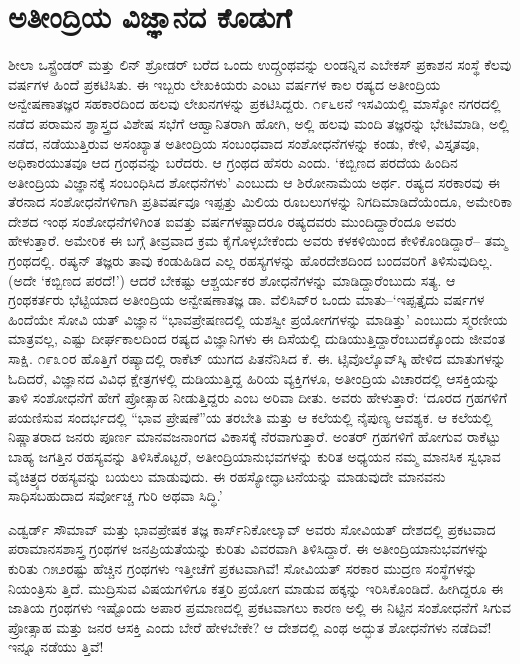 \section*{ಅತೀಂದ್ರಿಯ ವಿಜ್ಞಾನದ ಕೊಡುಗೆ}


ಶೀಲಾ ಒಸ್ಟ್ರೆಂಡರ್ ಮತ್ತು ಲಿನ್ ಶ್ರೋಡರ್ ಬರೆದ ಒಂದು ಉದ್ಗ್ರಂಥವನ್ನು ಲಂಡನ್ನಿನ ಎಬೇಕಸ್ ಪ್ರಕಾಶನ ಸಂಸ್ಥೆ ಕೆಲವು ವರ್ಷಗಳ ಹಿಂದೆ ಪ್ರಕಟಿಸಿತು. ಈ ಇಬ್ಬರು ಲೇಖಕಿಯರು ಎಂಟು ವರ್ಷಗಳ ಕಾಲ ರಷ್ಯದ ಅತೀಂದ್ರಿಯ ಅನ್ವೇಷಣಾತಜ್ಞರ ಸಹಕಾರದಿಂದ ಹಲವು ಲೇಖನಗಳನ್ನು ಪ್ರಕಟಿಸಿದ್ದರು. ೧೯೬೮ನೆ ಇಸವಿಯಲ್ಲಿ ಮಾಸ್ಕೋ ನಗರದಲ್ಲಿ ನಡೆದ ಪರಾಮನ ಶ್ಶಾಸ್ತ್ರದ ವಿಶೇಷ ಸಭೆಗೆ ಆಹ್ವಾನಿತರಾಗಿ ಹೋಗಿ, ಅಲ್ಲಿ ಹಲವು ಮಂದಿ ತಜ್ಞರನ್ನು ಭೇಟಿಮಾಡಿ, ಅಲ್ಲಿ ನಡೆದ, ನಡೆಯುತ್ತಿರುವ ಅಸಂಖ್ಯಾತ ಅತೀಂದ್ರಿಯ ಸಂಬಂಧವಾದ ಸಂಶೋಧನೆಗಳನ್ನು ಕಂಡು, ಕೇಳಿ, ವಿಸ್ತೃತವೂ, ಅಧಿಕಾರಯುತವೂ ಆದ ಗ್ರಂಥವನ್ನು ಬರೆದರು. ಆ ಗ್ರಂಥದ ಹೆಸರು  ಎಂದು. ‘ಕಬ್ಬಿಣದ ಪರದೆಯ ಹಿಂದಿನ ಅತೀಂದ್ರಿಯ ವಿಜ್ಞಾನಕ್ಕೆ ಸಂಬಂಧಿಸಿದ ಶೋಧನೆಗಳು’ ಎಂಬುದು ಆ ಶಿರೋನಾಮೆಯ ಅರ್ಥ. ರಷ್ಯದ ಸರಕಾರವು ಈ ತೆರನಾದ ಸಂಶೋಧನೆಗಳಿಗಾಗಿ ಪ್ರತಿವರ್ಷವೂ ಇಪ್ಪತ್ತು ಮಿಲಿಯ ರೂಬಲುಗಳನ್ನು ನಿಗದಿಮಾಡಿದೆಯೆಂದೂ, ಅಮೇರಿಕಾ ದೇಶದ ಇಂಥ ಸಂಶೋಧನೆಗಳಿಗಿಂತ ಐವತ್ತು ವರ್ಷಗಳಷ್ಟಾದರೂ ರಷ್ಯದವರು ಮುಂದಿದ್ದಾರೆಂದೂ ಅವರು ಹೇಳುತ್ತಾರೆ. ಅಮೇರಿಕ ಈ ಬಗ್ಗೆ ತೀವ್ರವಾದ ಕ್ರಮ ಕೈಗೊಳ್ಳಬೇಕೆಂದು ಅವರು ಕಳಕಳಿಯಿಂದ ಕೇಳಿಕೊಂಡಿದ್ದಾರೆ– ತಮ್ಮ ಗ್ರಂಥದಲ್ಲಿ. ರಷ್ಯನ್ ತಜ್ಞರು ತಾವು ಕಂಡುಹಿಡಿದ ಎಲ್ಲ ರಹಸ್ಯಗಳನ್ನು ಹೊರದೇಶದಿಂದ ಬಂದವರಿಗೆ ತಿಳಿಸುವುದಿಲ್ಲ. (ಅದೇ ‘ಕಬ್ಬಿಣದ ಪರದೆ!’) ಆದರೆ ಬೇಕಷ್ಟು ಆಶ್ಚರ್ಯಕರ ಶೋಧನೆಗಳನ್ನು ಮಾಡಿದ್ದಾರೆಂಬುದು ಸತ್ಯ. ಆ ಗ್ರಂಥಕರ್ತರು ಭೆಟ್ಟಿಯಾದ ಅತೀಂದ್ರಿಯ ಅನ್ವೇಷಣಾತಜ್ಞ ಡಾ. ವೆಲಿಸಿವ್​ರ ಒಂದು ಮಾತು–‘ಇಪ್ಪತ್ತೈದು ವರ್ಷಗಳ ಹಿಂದೆಯೇ ಸೋವಿ ಯತ್ ವಿಜ್ಞಾನ “ಭಾವಪ್ರೇಷಣದಲ್ಲಿ ಯಶಸ್ವೀ ಪ್ರಯೋಗಗಳನ್ನು ಮಾಡಿತ್ತು’ ಎಂಬುದು ಸ್ಮರಣೀಯ ಮಾತ್ರವಲ್ಲ, ಎಷ್ಟು ದೀರ್ಘಕಾಲದಿಂದ ರಷ್ಯದ ವಿಜ್ಞಾನಿಗಳು ಈ ದಿಸೆಯಲ್ಲಿ ದುಡಿಯುತ್ತಿದ್ದಾರೆಂಬುದಕ್ಕೊಂದು ಜೀವಂತ ಸಾಕ್ಷಿ. ೧೯೩೦ರ ಹೊತ್ತಿಗೆ ರಷ್ಯಾದಲ್ಲಿ ರಾಕೆಟ್ ಯುಗದ ಪಿತನೆನಿಸಿದ ಕೆ. ಈ. ಟ್ಸಿವೊಲ್ಕೊವ್​ಸ್ಕಿ ಹೇಳಿದ ಮಾತುಗಳನ್ನು ಓದಿದರೆ, ವಿಜ್ಞಾನದ ವಿವಿಧ ಕ್ಷೇತ್ರಗಳಲ್ಲಿ ದುಡಿಯುತ್ತಿದ್ದ ಹಿರಿಯ ವ್ಯಕ್ತಿಗಳೂ, ಅತೀಂದ್ರಿಯ ವಿಚಾರದಲ್ಲಿ ಆಸಕ್ತಿಯನ್ನು ತಾಳಿ ಸಂಶೋಧನೆಗೆ ಹೇಗೆ ಪ್ರೋತ್ಸಾಹ ನೀಡುತ್ತಿದ್ದರು ಎಂಬ ಅರಿವಾ ದೀತು. ಅವರು ಹೇಳುತ್ತಾರೆ: ‘ದೂರದ ಗ್ರಹಗಳಿಗೆ ಪಯಣಿಸುವ ಸಂದರ್ಭದಲ್ಲಿ “ಭಾವ ಪ್ರೇಷಣೆ”ಯ ತರಬೇತಿ ಮತ್ತು ಆ ಕಲೆಯಲ್ಲಿ ನೈಪುಣ್ಯ ಆವಶ್ಯಕ. ಆ ಕಲೆಯಲ್ಲಿ ನಿಷ್ಣಾತರಾದ ಜನರು ಪೂರ್ಣ ಮಾನವಜನಾಂಗದ ವಿಕಾಸಕ್ಕೆ ನೆರವಾಗುತ್ತಾರೆ. ಅಂತರ್ ಗ್ರಹಗಳಿಗೆ ಹೋಗುವ ರಾಕೆಟ್ಟು ಬಾಹ್ಯ ಜಗತ್ತಿನ ರಹಸ್ಯವನ್ನು ತಿಳಿಸಿಕೊಟ್ಟರೆ, ಅತೀಂದ್ರಿಯಾನುಭವಗಳನ್ನು ಕುರಿತ ಅಧ್ಯಯನ ನಮ್ಮ ಮಾನಸಿಕ ಸ್ವಭಾವ ವೈಚಿತ್ರ್ಯದ ರಹಸ್ಯವನ್ನು ಬಯಲು ಮಾಡುವುದು. ಈ ರಹಸ್ಯೋದ್ಘಾಟನೆಯನ್ನು ಮಾಡುವುದೇ ಮಾನವನು ಸಾಧಿಸಬಹುದಾದ ಸರ್ವೋಚ್ಚ ಗುರಿ ಅಥವಾ ಸಿದ್ಧಿ.’

ಎಡ್ವರ್ಡ್ ಸೌಮಾವ್ ಮತ್ತು ಭಾವಪ್ರೇಷಕ ತಜ್ಞ ಕಾರ್ಸ್​ನಿಕೋಲಾೖವ್ ಅವರು ಸೋವಿಯತ್ ದೇಶದಲ್ಲಿ ಪ್ರಕಟವಾದ ಪರಾಮಾನಸಶಾಸ್ತ್ರ ಗ್ರಂಥಗಳ ಜನಪ್ರಿಯತೆಯನ್ನು ಕುರಿತು ವಿವರವಾಗಿ ತಿಳಿಸಿದ್ದಾರೆ. ಈ ಅತೀಂದ್ರಿಯಾನುಭವಗಳನ್ನು ಕುರಿತು ೧೫೨ರಷ್ಟು ಹೆಚ್ಚಿನ ಗ್ರಂಥಗಳು ಇತ್ತೀಚೆಗೆ ಪ್ರಕಟವಾಗಿವೆ! ಸೋವಿಯತ್ ಸರಕಾರ ಮುದ್ರಣ ಸಂಸ್ಥೆಗಳನ್ನು ನಿಯಂತ್ರಿಸು ತ್ತಿದೆ. ಮುದ್ರಿಸುವ ವಿಷಯಗಳಿಗೂ ಕತ್ತರಿ ಪ್ರಯೋಗ ಮಾಡುವ ಹಕ್ಕನ್ನು ಇರಿಸಿಕೊಂಡಿದೆ. ಹೀಗಿದ್ದರೂ ಈ ಜಾತಿಯ ಗ್ರಂಥಗಳು ಇಷ್ಟೊಂದು ಅಪಾರ ಪ್ರಮಾಣದಲ್ಲಿ ಪ್ರಕಟವಾಗಲು ಕಾರಣ ಅಲ್ಲಿ ಈ ನಿಟ್ಟಿನ ಸಂಶೋಧನೆಗೆ ಸಿಗುವ ಪ್ರೋತ್ಸಾಹ ಮತ್ತು ಜನರ ಆಸಕ್ತಿ ಎಂದು ಬೇರೆ ಹೇಳಬೇಕೇ? ಆ ದೇಶದಲ್ಲಿ ಎಂಥ ಅದ್ಭುತ ಶೋಧನೆಗಳು ನಡೆದಿವೆ! ಇನ್ನೂ ನಡೆಯು ತ್ತಿವೆ!

